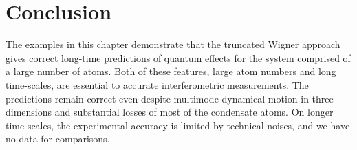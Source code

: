 \section{Conclusion}

The examples in this chapter demonstrate that the truncated Wigner approach gives correct long-time predictions of quantum effects for the system comprised of a large number of atoms.
Both of these features, large atom numbers and long time-scales, are essential to accurate interferometric measurements.
The predictions remain correct even despite multimode dynamical motion in three dimensions and substantial losses of most of the condensate atoms.
On longer time-scales, the experimental accuracy is limited by technical noises, and we have no data for comparisons.
